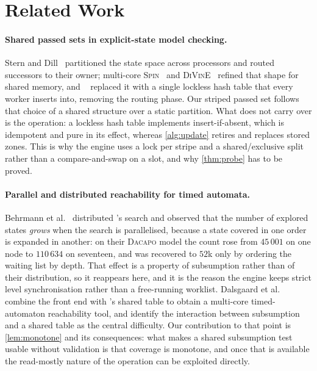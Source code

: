 \section{Related Work}\label{sec:related}

\paragraph{Shared passed sets in explicit-state model checking.}
Stern and Dill~\cite{Stern01} partitioned the state space across processors and
routed successors to their owner; multi-core \textsc{Spin}~\cite{Holzmann07} and
\textsc{DiVinE}~\cite{Barnat12} refined that shape for shared memory, and
\ltsmin{}~\cite{Laarman10,Kant15} replaced it with a single lockless hash table
that every worker inserts into, removing the routing phase.  Our striped passed
set follows that choice of a shared structure over a static partition.  What does
not carry over is the operation: a lockless hash table implements
insert-if-absent, which is idempotent and pure in its effect, whereas
\cref{alg:update} retires and replaces stored zones.  This is why the engine uses
a lock per stripe and a shared/exclusive split rather than a compare-and-swap on
a slot, and why \cref{thm:probe} has to be proved.

\paragraph{Parallel and distributed reachability for timed automata.}
Behrmann et al.~\cite{Behrmann00,Behrmann05} distributed \uppaal{}'s search and
observed that the number of explored states \emph{grows} when the search is
parallelised, because a state covered in one order is expanded in another: on
their \textsc{Dacapo} model the count rose from $45\,001$ on one node to
$110\,634$ on seventeen, and was recovered to $52$k only by ordering the waiting
list by depth.  That effect is a property of subsumption rather than of their
distribution, so it reappears here, and it is the reason the engine keeps strict
level synchronisation rather than a free-running worklist.
Dalsgaard et al.~\cite{Dalsgaard12} combine the \opaal{} front end with
\ltsmin{}'s shared table to obtain a multi-core timed-automaton reachability
tool, and identify the interaction between subsumption and a shared table as the
central difficulty.  Our contribution to that point is \cref{lem:monotone} and
its consequences: what makes a shared subsumption test usable without validation
is that coverage is monotone, and once that is available the read-mostly nature
of the operation can be exploited directly.

